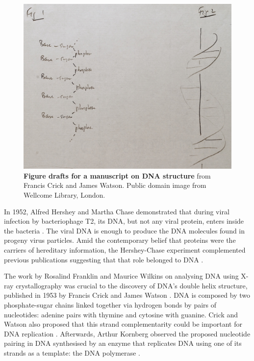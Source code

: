 \begin{figure}
  \includegraphics[width=\linewidth]{images/intro/dna_structure_draft_cropped}
  \caption[Figure drafts for a manuscript on DNA structure]{\textbf{Figure drafts for a manuscript on DNA structure} from Francis Crick and James Watson. Public domain image from Wellcome Library, London.}
  \label{fig:dna-structure}
\end{figure}

In 1952, Alfred Hershey and Martha Chase demonstrated that during viral infection by bacteriophage T2, its DNA, but not any viral protein, enters inside the bacteria \cite{hershey:1952wo}. The viral DNA is enough to produce the DNA molecules found in progeny virus particles. Amid the contemporary belief that proteins were the carriers of hereditary information, the Hershey-Chase experiment complemented previous publications suggesting that that role belonged to DNA \cite{hershey:1952wo}.

The work by Rosalind Franklin and Maurice Wilkins on analysing DNA using X-ray crystallography was crucial to the discovery of DNA's double helix structure, published in 1953 by Francis Crick and James Watson \cite{watson:1953ug}. DNA is composed by two phosphate-sugar chains linked together via hydrogen bonds by pairs of nucleotides: adenine pairs with thymine and cytosine with guanine. Crick and Watson also proposed that this strand complementarity could be important for DNA replication \cite{watson:1953ug}. Afterwards, Arthur Kornberg observed the proposed nucleotide pairing in DNA synthesised by an enzyme that replicates DNA using one of its strands as a template: the DNA polymerase \cite{kornberg:1956wk}.

